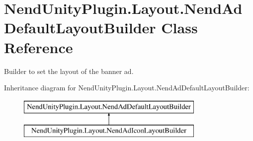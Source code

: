 \hypertarget{class_nend_unity_plugin_1_1_layout_1_1_nend_ad_default_layout_builder}{}\section{Nend\+Unity\+Plugin.\+Layout.\+Nend\+Ad\+Default\+Layout\+Builder Class Reference}
\label{class_nend_unity_plugin_1_1_layout_1_1_nend_ad_default_layout_builder}


Builder to set the layout of the banner ad.  


Inheritance diagram for Nend\+Unity\+Plugin.\+Layout.\+Nend\+Ad\+Default\+Layout\+Builder\+:\begin{figure}[H]
\begin{center}
\leavevmode
\includegraphics[height=2.000000cm]{class_nend_unity_plugin_1_1_layout_1_1_nend_ad_default_layout_builder}
\end{center}
\end{figure}
